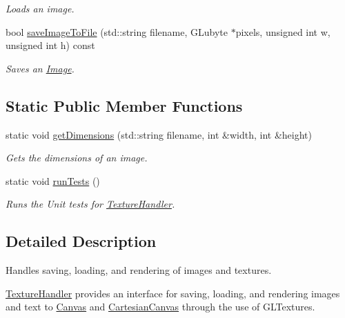 \begin{DoxyCompactItemize}
\begin{DoxyCompactList}\small\item\em Loads an image. \end{DoxyCompactList}\item 
bool \hyperlink{classtsgl_1_1_texture_handler_aa4f56141895c91c9580b77f09e9a70de}{save\+Image\+To\+File} (std\+::string filename, G\+Lubyte $\ast$pixels, unsigned int w, unsigned int h) const 
\begin{DoxyCompactList}\small\item\em Saves an \hyperlink{classtsgl_1_1_image}{Image}. \end{DoxyCompactList}\end{DoxyCompactItemize}
\subsection*{Static Public Member Functions}
\begin{DoxyCompactItemize}
\item 
static void \hyperlink{classtsgl_1_1_texture_handler_ab88095c1d6bfc4181390165312298ff3}{get\+Dimensions} (std\+::string filename, int \&width, int \&height)
\begin{DoxyCompactList}\small\item\em Gets the dimensions of an image. \end{DoxyCompactList}\item 
\hypertarget{classtsgl_1_1_texture_handler_ac69f1c04f7ec17f475a5aac322f5ba6a}{}static void \hyperlink{classtsgl_1_1_texture_handler_ac69f1c04f7ec17f475a5aac322f5ba6a}{run\+Tests} ()\label{classtsgl_1_1_texture_handler_ac69f1c04f7ec17f475a5aac322f5ba6a}

\begin{DoxyCompactList}\small\item\em Runs the Unit tests for \hyperlink{classtsgl_1_1_texture_handler}{Texture\+Handler}. \end{DoxyCompactList}\end{DoxyCompactItemize}


\subsection{Detailed Description}
Handles saving, loading, and rendering of images and textures. 

\hyperlink{classtsgl_1_1_texture_handler}{Texture\+Handler} provides an interface for saving, loading, and rendering images and text to \hyperlink{classtsgl_1_1_canvas}{Canvas} and \hyperlink{classtsgl_1_1_cartesian_canvas}{Cartesian\+Canvas} through the use of G\+L\+Textures. 

